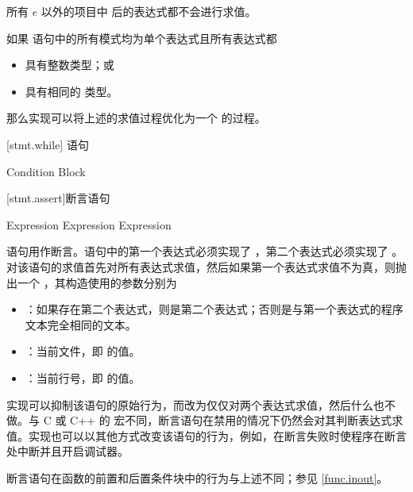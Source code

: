 所有 $e$ 以外的项目中 \tcode{=>} 后的表达式都不会进行求值。

\pnum
如果  语句中的所有模式均为单个表达式且所有表达式都

\begin{itemize}
\item 具有整数类型；或
\item 具有相同的  类型。
\end{itemize}

那么实现可以将上述的求值过程优化为一个  的过程。

[stmt.while]{ 语句}

\begin{bnf}
 \br
     Condition Block
\end{bnf}

[stmt.assert]{断言语句}

\begin{bnf}
 \br
     Expression \br
     Expression \terminal{:} Expression
\end{bnf}

\pnum
{} 语句用作断言。语句中的第一个表达式必须实现了 ，第二个表达式必须实现了 。对该语句的求值首先对所有表达式求值，然后如果第一个表达式求值不为真，则抛出一个 ，其构造使用的参数分别为

\begin{itemize}
\item {}：如果存在第二个表达式，则是第二个表达式；否则是与第一个表达式的程序文本完全相同的文本。
\item {}：当前文件，即  的值。
\item {}：当前行号，即  的值。
\end{itemize}

\pnum
实现可以抑制该语句的原始行为，而改为仅仅对两个表达式求值，然后什么也不做。\enternote 与 C 或 C++ 的  宏不同，断言语句在禁用的情况下仍然会对其判断表达式求值。\exitnote 实现也可以以其他方式改变该语句的行为，\enternote 例如，在断言失败时使程序在断言处中断并且开启调试器。 \exitnote

\pnum
断言语句在函数的前置和后置条件块中的行为与上述不同；参见 \ref{func.inout}。
